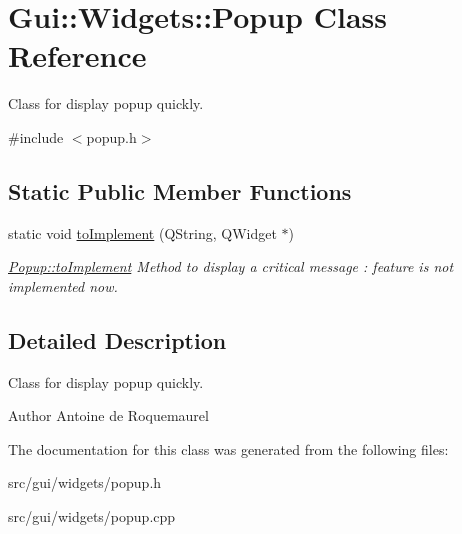\hypertarget{classGui_1_1Widgets_1_1Popup}{}\section{Gui\+:\+:Widgets\+:\+:Popup Class Reference}
\label{classGui_1_1Widgets_1_1Popup}


Class for display popup quickly.  




{\ttfamily \#include $<$popup.\+h$>$}

\subsection*{Static Public Member Functions}
\begin{DoxyCompactItemize}
\item 
\hypertarget{classGui_1_1Widgets_1_1Popup_ac4a9958b16b454eab84eeb95a1f01fa7}{}static void \hyperlink{classGui_1_1Widgets_1_1Popup_ac4a9958b16b454eab84eeb95a1f01fa7}{to\+Implement} (Q\+String, Q\+Widget $\ast$)\label{classGui_1_1Widgets_1_1Popup_ac4a9958b16b454eab84eeb95a1f01fa7}

\begin{DoxyCompactList}\small\item\em \hyperlink{classGui_1_1Widgets_1_1Popup_ac4a9958b16b454eab84eeb95a1f01fa7}{Popup\+::to\+Implement} Method to display a critical message \+: feature is not implemented now. \end{DoxyCompactList}\end{DoxyCompactItemize}


\subsection{Detailed Description}
Class for display popup quickly. 

\begin{DoxyAuthor}{Author}
Antoine de Roquemaurel 
\end{DoxyAuthor}


The documentation for this class was generated from the following files\+:\begin{DoxyCompactItemize}
\item 
src/gui/widgets/popup.\+h\item 
src/gui/widgets/popup.\+cpp\end{DoxyCompactItemize}
